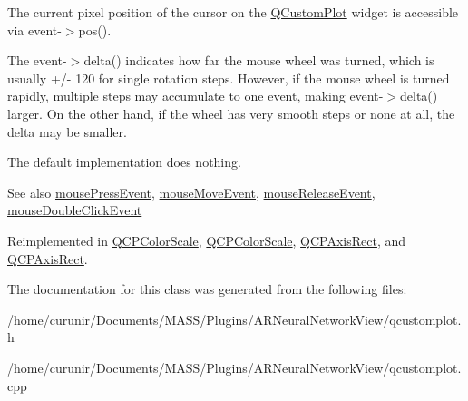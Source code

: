 The current pixel position of the cursor on the \hyperlink{class_q_custom_plot}{Q\+Custom\+Plot} widget is accessible via {\ttfamily event-\/$>$pos()}.

The {\ttfamily event-\/$>$delta()} indicates how far the mouse wheel was turned, which is usually +/-\/ 120 for single rotation steps. However, if the mouse wheel is turned rapidly, multiple steps may accumulate to one event, making {\ttfamily event-\/$>$delta()} larger. On the other hand, if the wheel has very smooth steps or none at all, the delta may be smaller.

The default implementation does nothing.

\begin{DoxySeeAlso}{See also}
\hyperlink{class_q_c_p_layerable_af6567604818db90f4fd52822f8bc8376}{mouse\+Press\+Event}, \hyperlink{class_q_c_p_layerable_a9eee1ba47fd69be111059ca3881933e4}{mouse\+Move\+Event}, \hyperlink{class_q_c_p_layerable_aa0d79b005686f668622bbe66ac03ba2c}{mouse\+Release\+Event}, \hyperlink{class_q_c_p_layerable_a4171e2e823aca242dd0279f00ed2de81}{mouse\+Double\+Click\+Event} 
\end{DoxySeeAlso}


Reimplemented in \hyperlink{class_q_c_p_color_scale_a63cf19be184f6670c9495ad3a9a1baeb}{Q\+C\+P\+Color\+Scale}, \hyperlink{class_q_c_p_color_scale_a5cda10e845bfe04ed63efd55acc212ae}{Q\+C\+P\+Color\+Scale}, \hyperlink{class_q_c_p_axis_rect_a93eeaa0c127d6d6fe8171b2455080262}{Q\+C\+P\+Axis\+Rect}, and \hyperlink{class_q_c_p_axis_rect_a2ca1c7bf10a472147df1b7d7bc6bfe93}{Q\+C\+P\+Axis\+Rect}.



The documentation for this class was generated from the following files\+:\begin{DoxyCompactItemize}
\item 
/home/curunir/\+Documents/\+M\+A\+S\+S/\+Plugins/\+A\+R\+Neural\+Network\+View/qcustomplot.\+h\item 
/home/curunir/\+Documents/\+M\+A\+S\+S/\+Plugins/\+A\+R\+Neural\+Network\+View/qcustomplot.\+cpp\end{DoxyCompactItemize}
